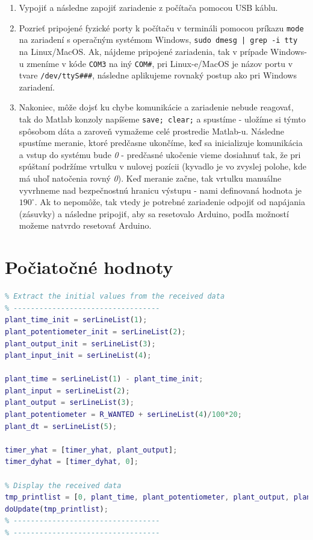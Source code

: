 \documentclass[a4paper, 10pt, ]{article}
\begin{document}
\begin{enumerate}
    \item Vypojiť a následne zapojiť zariadenie z počítača pomocou USB káblu.
    \item Pozrieť pripojené fyzické porty k počítaču v termináli pomocou príkazu \texttt{mode} na zariadení s operačným systémom Windows, \texttt{sudo dmesg | grep -i tty} na Linux/MacOS. Ak, nájdeme pripojené zariadenia, tak v prípade Windows-u zmeníme v kóde \texttt{COM3} na iný \texttt{COM#}, pri Linux-e/MacOS je názov portu v tvare \texttt{/dev/ttyS###}, následne aplikujeme rovnaký postup ako pri Windows zariadení.
    \item Nakoniec, môže dojsť ku chybe komunikácie a zariadenie nebude reagovať, tak do Matlab konzoly napíšeme \texttt{save; clear;} a spustíme - uložíme si týmto spôsobom dáta a zaroveň vymažeme celé prostredie Matlab-u. Následne spustíme meranie, ktoré predčasne ukončíme, keď sa inicializuje komunikácia a vstup do systému bude \emph{0} - predčasné ukočenie vieme dosiahnuť tak, že pri spúštaní podržíme vrtulku v nulovej pozícii (kyvadlo je vo zvyslej polohe, kde má uhoľ natočenia rovný \emph{0}). Keď meranie začne, tak vrtulku manuálne vyvrhneme nad bezpečnostnú hranicu výstupu - nami definovaná hodnota je $190^\circ$. Ak to nepomôže, tak vtedy je potrebné zariadenie odpojiť od napájania (zásuvky) a následne pripojiť, aby sa resetovalo Arduino, podľa možností možeme natvrdo resetovať Arduino.
\end{enumerate}

\section{Počiatočné hodnoty}
\begin{lstlisting}[caption=Zaznamenanie počiatočných hodnôt., label={code:init_values}, language=Matlab]
% ----------------------------------
% Extract the initial values from the received data
% ----------------------------------
plant_time_init = serLineList(1);
plant_potentiometer_init = serLineList(2);
plant_output_init = serLineList(3);
plant_input_init = serLineList(4);

plant_time = serLineList(1) - plant_time_init;
plant_input = serLineList(2);
plant_output = serLineList(3);
plant_potentiometer = R_WANTED + serLineList(4)/100*20;
plant_dt = serLineList(5);

timer_yhat = [timer_yhat, plant_output];
timer_dyhat = [timer_dyhat, 0];

% Display the received data
tmp_printlist = [0, plant_time, plant_potentiometer, plant_output, plant_input, plant_dt, T_sample];
doUpdate(tmp_printlist);
% ----------------------------------
% ----------------------------------
\end{lstlisting}
\end{document}
